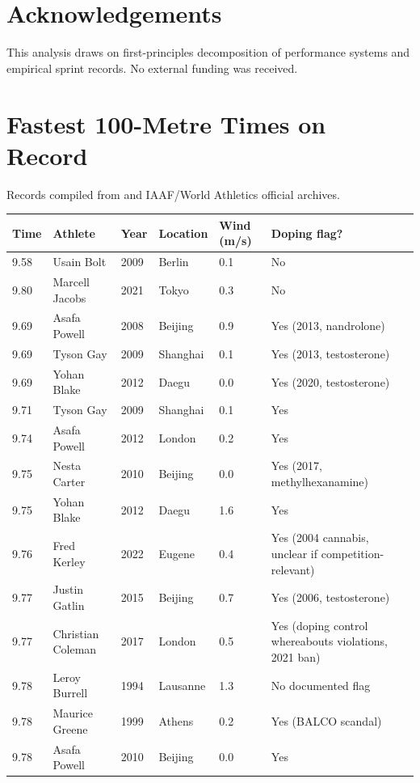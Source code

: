 \documentclass[11pt,twocolumn]{article}
\theoremstyle{definition}
\theoremstyle{remark}
\begin{document}

\section*{Acknowledgements}

This analysis draws on first-principles decomposition of performance systems and empirical sprint records. No external funding was received.

\appendix

\section{Fastest 100-Metre Times on Record}
\label{app:records}

Records compiled from \cite{bolt2008,paris2024olympics,enhanced2026official} and IAAF/World Athletics official archives.

\begin{center}
\small
\begin{tabular}{llllll}
\toprule
\textbf{Time} & \textbf{Athlete} & \textbf{Year} & \textbf{Location} & \textbf{Wind (m/s)} & \textbf{Doping flag?} \\
\midrule
9.58 & Usain Bolt & 2009 & Berlin & 0.1 & No \\
9.80 & Marcell Jacobs & 2021 & Tokyo & 0.3 & No \\
9.69 & Asafa Powell & 2008 & Beijing & 0.9 & Yes (2013, nandrolone) \\
9.69 & Tyson Gay & 2009 & Shanghai & 0.1 & Yes (2013, testosterone) \\
9.69 & Yohan Blake & 2012 & Daegu & 0.0 & Yes (2020, testosterone) \\
9.71 & Tyson Gay & 2009 & Shanghai & 0.1 & Yes \\
9.74 & Asafa Powell & 2012 & London & 0.2 & Yes \\
9.75 & Nesta Carter & 2010 & Beijing & 0.0 & Yes (2017, methylhexanamine) \\
9.75 & Yohan Blake & 2012 & Daegu & 1.6 & Yes \\
9.76 & Fred Kerley & 2022 & Eugene & 0.4 & Yes (2004 cannabis, unclear if competition-relevant) \\
9.77 & Justin Gatlin & 2015 & Beijing & 0.7 & Yes (2006, testosterone) \\
9.77 & Christian Coleman & 2017 & London & 0.5 & Yes (doping control whereabouts violations, 2021 ban) \\
9.78 & Leroy Burrell & 1994 & Lausanne & 1.3 & No documented flag \\
9.78 & Maurice Greene & 1999 & Athens & 0.2 & Yes (BALCO scandal) \\
9.78 & Asafa Powell & 2010 & Beijing & 0.0 & Yes \\
\bottomrule
\end{tabular}
\end{center}
\end{document}
